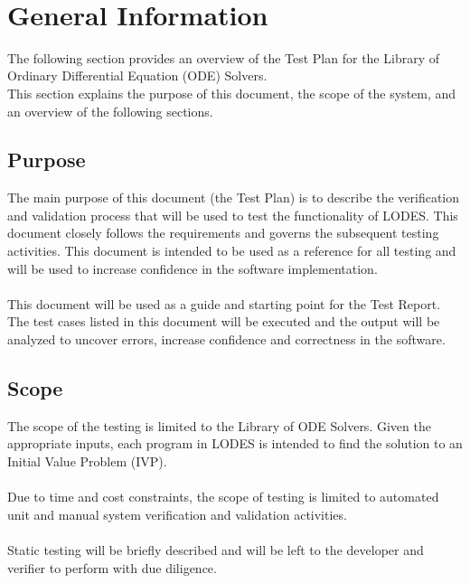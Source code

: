 \documentclass[12pt, titlepage]{article}
\newcommand{\famname}{LODES} %
\newcommand{\famdesc}{Library of ODE Solvers}
\begin{document}
~\newpage

\tableofcontents

\listoftables


\newpage



\section{General Information}
The following section provides an overview of the Test Plan for the Library of Ordinary Differential Equation (ODE) 
Solvers.\\
This section explains the purpose of this document, the scope of the system, and an overview of the following 
sections.

\subsection{Purpose}
The main purpose of this document (the Test Plan) is to describe the verification and validation process that will 
be used to test the functionality of \famname{}.  This document closely follows the requirements and governs
the subsequent testing activities. This document is intended to be used as a reference for all testing and will be
used to increase confidence in the 
software implementation.\\
\\
This document will be used as a guide and starting point for the Test Report. The test cases
listed in this document will be executed and the output will be analyzed to uncover errors, increase confidence 
and correctness in the software.

\subsection{Scope}
The scope of the testing is limited to the \famdesc{}. Given the appropriate inputs, each program in \famname{} is 
intended to find
the solution to an Initial Value Problem (IVP).\\
\\
Due to time and cost constraints, the scope of testing is limited to automated unit and manual system verification 
and validation activities.\\
\\
Static testing will be briefly described and will be left to the developer and verifier to perform with due diligence.
\end{document}

